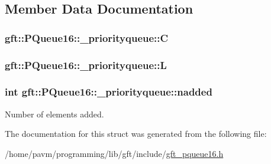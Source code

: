 \subsection{Member Data Documentation}
\hypertarget{structgft_1_1PQueue16_1_1__priorityqueue_a3b00179eb83c3aceea4078e4b5e4fb53}{
\subsubsection[{C}]{ gft\-::\-P\-Queue16\-::\-\_\-priorityqueue\-::\-C}}\label{structgft_1_1PQueue16_1_1__priorityqueue_a3b00179eb83c3aceea4078e4b5e4fb53}
\hypertarget{structgft_1_1PQueue16_1_1__priorityqueue_a88a19657df74ff6d933e82ca2aacbb7e}{
\subsubsection[{L}]{ gft\-::\-P\-Queue16\-::\-\_\-priorityqueue\-::\-L}}\label{structgft_1_1PQueue16_1_1__priorityqueue_a88a19657df74ff6d933e82ca2aacbb7e}
\hypertarget{structgft_1_1PQueue16_1_1__priorityqueue_a1d36f79c71162c0d7c8cfb5cc9a56150}{
\subsubsection[{nadded}]{\setlength{\rightskip}{0pt plus 5cm}int gft\-::\-P\-Queue16\-::\-\_\-priorityqueue\-::nadded}}\label{structgft_1_1PQueue16_1_1__priorityqueue_a1d36f79c71162c0d7c8cfb5cc9a56150}


Number of elements added. 



The documentation for this struct was generated from the following file\-:\begin{DoxyCompactItemize}
\item 
/home/pavm/programming/lib/gft/include/\hyperlink{gft__pqueue16_8h}{gft\-\_\-pqueue16.\-h}\end{DoxyCompactItemize}
